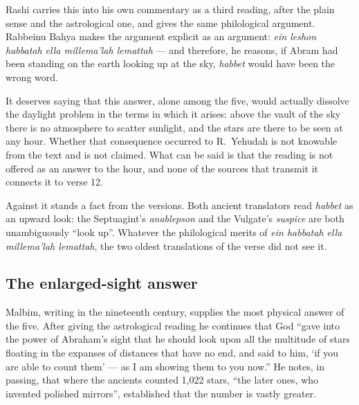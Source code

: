 Rashi carries this into his own commentary as a third reading, after the plain
sense and the astrological one, and gives the same philological
argument. Rabbeinu Bahya makes the argument explicit
as an argument: \textit{ein leshon habbatah ella millema'lah lemattah} --- and
therefore, he reasons, if Abram had been standing on the earth looking up at the
sky, \textit{habbet} would have been the wrong word.

It deserves saying that this answer, alone among the five, would actually
dissolve the daylight problem in the terms in which it arises: above the vault
of the sky there is no atmosphere to scatter sunlight, and the stars are there to
be seen at any hour. Whether that consequence occurred to R.~Yehudah is not
knowable from the text and is not claimed. What can be said is that the reading
is not offered as an answer to the hour, and none of the sources that transmit it
connects it to verse 12.

Against it stands a fact from the versions. Both ancient translators read
\textit{habbet} as an upward look: the Septuagint's \textit{anablepson} and the
Vulgate's \textit{suspice} are both unambiguously ``look up''. Whatever the
philological merits of \textit{ein habbatah ella millema'lah lemattah}, the two
oldest translations of the verse did not see it.

\subsection{The enlarged-sight answer}

Malbim, writing in the nineteenth century, supplies the most physical answer of
the five. After giving the astrological reading he continues that God ``gave
into the power of Abraham's sight that he should look upon all the multitude of
stars floating in the expanses of distances that have no end, and said to him,
`if you are able to count them' --- as I am showing them to you now.'' He notes,
in passing, that where the ancients counted 1,022 stars, ``the later ones, who
invented polished mirrors'', established that the number is vastly
greater.

